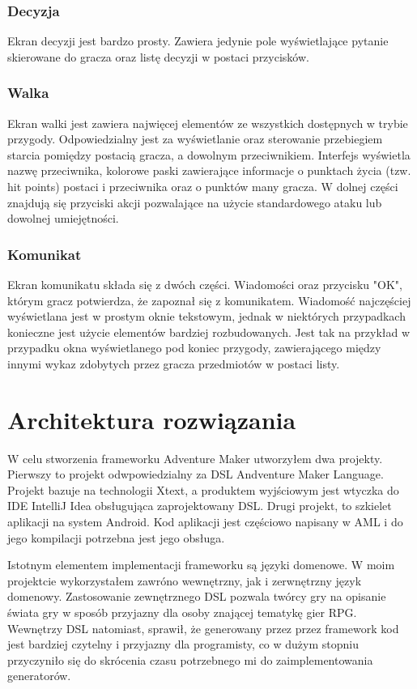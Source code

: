 \documentclass	{xmgr}
\begin{document}
\subsection*{Decyzja}
Ekran decyzji jest bardzo prosty. Zawiera jedynie pole wyświetlające pytanie skierowane do gracza oraz listę decyzji w postaci przycisków.
\subsection*{Walka}
Ekran walki jest zawiera najwięcej elementów ze wszystkich dostępnych w trybie przygody. Odpowiedzialny jest za wyświetlanie oraz sterowanie przebiegiem starcia pomiędzy postacią gracza, a dowolnym przeciwnikiem. Interfejs wyświetla nazwę przeciwnika, kolorowe paski zawierające informacje o punktach życia (tzw. hit points) postaci i przeciwnika oraz o punktów many gracza. W dolnej części znajdują się przyciski akcji pozwalające na użycie standardowego ataku lub dowolnej umiejętności.
\subsection*{Komunikat}
Ekran komunikatu składa się z dwóch części. Wiadomości oraz przycisku "OK", którym gracz potwierdza, że zapoznał się z komunikatem. Wiadomość najczęściej wyświetlana jest w prostym oknie tekstowym, jednak w niektórych przypadkach konieczne jest użycie elementów bardziej rozbudowanych. Jest tak na przykład w przypadku okna wyświetlanego pod koniec przygody, zawierającego między innymi wykaz zdobytych przez gracza przedmiotów w postaci listy.
\chapter{Architektura rozwiązania}
W celu stworzenia frameworku Adventure Maker utworzyłem dwa projekty. Pierwszy to projekt odwpowiedzialny za DSL Andventure Maker Language. Projekt bazuje na technologii Xtext, a produktem wyjściowym jest wtyczka do IDE IntelliJ Idea obsługująca zaprojektowany DSL.
Drugi projekt, to szkielet aplikacji na system Android. Kod aplikacji jest częściowo napisany w AML i do jego kompilacji potrzebna jest jego obsługa.

Istotnym elementem implementacji frameworku są języki domenowe. W moim projektcie wykorzystałem zawróno wewnętrzny, jak i zerwnętrzny język domenowy. Zastosowanie zewnętrznego DSL pozwala twórcy gry na opisanie świata gry w sposób przyjazny dla osoby znającej tematykę gier RPG. Wewnętrzy DSL natomiast, sprawił, że generowany przez przez framework kod jest bardziej czytelny i przyjazny dla programisty, co w dużym stopniu przyczyniło się do skrócenia czasu potrzebnego mi do zaimplementowania generatorów.
\end{document}
